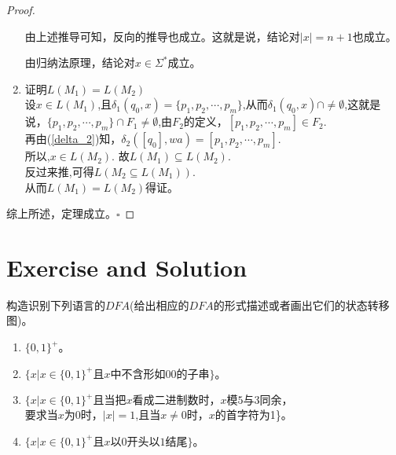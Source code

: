 \begin{proof}
\begin{enumerate}
		由上述推导可知，反向的推导也成立。这就是说，结论对$|x|=n+1$也成立。
		
		由归纳法原理，结论对$x\in\Sigma^\ast$成立。
		
		\item 证明$L(M_1)=L(M_2)$\\
		设$x\in L(M_1)$,且$\delta_1(q_0,x)=\{p_1,p_2,\cdots,p_m\}$,从而$\delta_1(q_0,x)\cap\ne\emptyset$,这就是说，$\{p_1,p_2,\cdots,p_m\}\cap F_1\ne\emptyset$,由$F_2$的定义，$[p_1,p_2,\cdots,p_m]\in F_2$.\\
		再由(\ref{delta_2})知，$\delta_2([q_0],wa)=[p_1,p_2,\cdots,p_m]$.\\
		所以,$x\in L(M_2)$. 故$L(M_1)\subseteq L(M_2)$.\\
		反过来推,可得$L(M_2\subseteq L(M_1))$.\\
		从而$L(M_1)=L(M_2)$得证。
	\end{enumerate}
	综上所述，定理成立。\hfill$\square$
\end{proof}

\section{Exercise and Solution}
\begin{exercise}
	构造识别下列语言的$DFA$(给出相应的$DFA$的形式描述或者画出它们的状态转移图)。
	\begin{enumerate}
		\item $\{0,1\}^+$。
		\item $\{x|x\in\{0,1\}^+\text{且$x$中不含形如$00$的子串}\}$。
		\item $\{x|x\in \{0,1\}^+ \text{且当把$x$看成二进制数时，$x$模5与3同余，}$\\ 
			  要求当$x$为0时，$|x|=1$,且当$x\ne 0$时，$x$的首字符为1\}。
        \item $\{x|x\in\{0,1\}^+\text{且$x$以0开头以1结尾}\}$。
	\end{enumerate}
\end{exercise}
	

